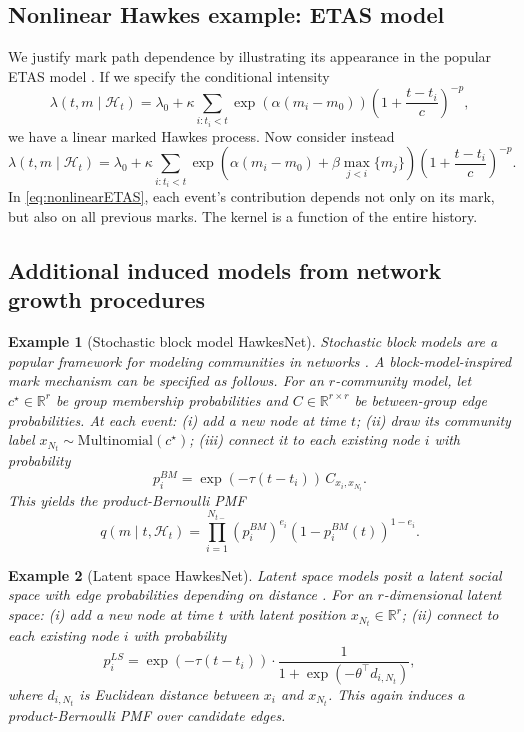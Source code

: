 \documentclass[12pt]{article}
\newtheorem{example}{Example}
\begin{document}
\subsection{Nonlinear Hawkes example: ETAS model}\label{app:ETAS}

We justify mark path dependence by illustrating its appearance in the popular ETAS model \citep{ogata1998space}. If we specify the conditional intensity
\[
\lambda(t,m\mid\mathcal{H}_t)=\lambda_0+\kappa \sum_{i:t_i<t}\exp(\alpha(m_i-m_0))\left(1+\frac{t-t_i}{c}\right)^{-p},
\]
we have a linear marked Hawkes process. Now consider instead
\begin{equation}\label{eq:nonlinearETAS}
\lambda(t,m\mid\mathcal{H}_t)=\lambda_0+\kappa \sum_{i:t_i<t}\exp(\alpha(m_i-m_0)+\beta\max_{j<i} \{m_j\})\left(1+\frac{t-t_i}{c}\right)^{-p}.
\end{equation}
In \eqref{eq:nonlinearETAS}, each event’s contribution depends not only on its mark, but also on all previous marks. The kernel is a function of the entire history.

\subsection{Additional induced models from network growth procedures}\label{app:more_induced}

\begin{example}[Stochastic block model HawkesNet]
Stochastic block models are a popular framework for modeling communities in networks \citep{block_models_1,block_models_2,block_models_3}. A block-model-inspired mark mechanism can be specified as follows. For an $r$-community model, let $c^\star\in\mathbb R^r$ be group membership probabilities and $C\in\mathbb R^{r\times r}$ be between-group edge probabilities. At each event:
(i) add a new node at time $t$; (ii) draw its community label $x_{N_t}\sim\mathrm{Multinomial}(c^\star)$; (iii) connect it to each existing node $i$ with probability
\[
p_i^{BM}=\exp(-\tau(t-t_i))\,C_{x_i,x_{N_t}}.
\]
This yields the product-Bernoulli PMF
\[
q(m\mid t,\mathcal H_t)=\prod_{i=1}^{N_{t-}} (p_i^{BM})^{e_i}(1-p_i^{BM}(t))^{1-e_i}.
\]
\end{example}

\begin{example}[Latent space HawkesNet]
Latent space models posit a latent social space with edge probabilities depending on distance \citep{latent_space_1,latent_space_2,latent_space_3}. For an $r$-dimensional latent space: (i) add a new node at time $t$ with latent position $x_{N_t}\in\mathbb R^r$; (ii) connect to each existing node $i$ with probability
\[
p_i^{LS}=\exp(-\tau(t-t_i))\cdot \frac{1}{1+\exp(-\theta^\top d_{i,N_t})},
\]
where $d_{i,N_t}$ is Euclidean distance between $x_i$ and $x_{N_t}$. This again induces a product-Bernoulli PMF over candidate edges.
\end{example}
\end{document}
